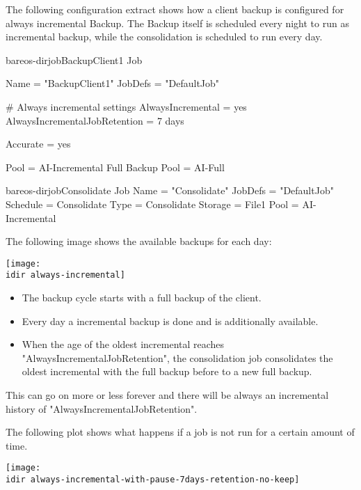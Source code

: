 The following configuration extract shows how a client backup is configured for always incremental Backup.
The Backup itself is scheduled every night to run as incremental backup, while the consolidation is scheduled to run every day.

\begin{bareosConfigResource}{bareos-dir}{job}{BackupClient1}
Job {
  Name = "BackupClient1"
  JobDefs = "DefaultJob"

  # Always incremental settings
  AlwaysIncremental = yes
  AlwaysIncrementalJobRetention = 7 days

  Accurate = yes

  Pool = AI-Incremental
  Full Backup Pool = AI-Full

}
\end{bareosConfigResource}

\begin{bareosConfigResource}{bareos-dir}{job}{Consolidate}
Job {
  Name = "Consolidate"
  JobDefs = "DefaultJob"
  Schedule = Consolidate
  Type = Consolidate
  Storage = File1
  Pool = AI-Incremental
}
\end{bareosConfigResource}



The following image shows the available backups for each day:

\begin{center}
\texttt{[image: \\idir always-incremental]}
\end{center}


\begin{itemize}
    \item The backup cycle starts with a full backup of the client. 
    \item Every day a incremental backup is done and is additionally available.
    \item When the age of the oldest incremental reaches "AlwaysIncrementalJobRetention", the consolidation job consolidates the oldest incremental with the full backup before to a new full backup.
\end{itemize}

This can go on more or less forever and there will be always an incremental history of "AlwaysIncrementalJobRetention".


The following plot shows what happens if a job is not run for a certain amount of time.

\begin{center}
\texttt{[image: \\idir always-incremental-with-pause-7days-retention-no-keep]}
\end{center}

